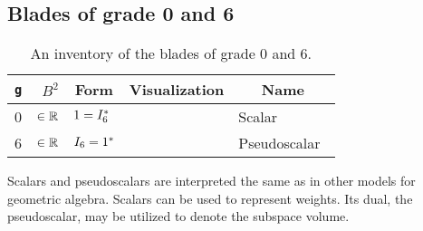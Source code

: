 
\subsection{Blades of grade 0 and 6}
\begin{table}
  \caption{An inventory of the blades of grade 0 and 6.}
  \label{tab:inv0}
  \begin{center}
    \begin{tabular}{|c|r|l|c|l|}
      \hline
      \multicolumn{1}{|c|}{\texttt{g}} & $B^2$ & \multicolumn{1}{|c|}{Form} & \multicolumn{1}{|c|}{Visualization} & \multicolumn{1}{|c|}{Name} \\ \hline
      \hline
      0 & $\in \mathbb{R}$ & $1 = I_6^\ast$ & & Scalar~\cite{TheBook} \\ \hline
      6 & $\in \mathbb{R}$ & $I_6 = 1^\ast$ & & Pseudoscalar~\cite{TheBook} \\ \hline
    \end{tabular}
  \end{center}
\end{table}

Scalars and pseudoscalars are interpreted the same as in other models for geometric algebra.  Scalars can be used to represent weights.  Its dual, the pseudoscalar, may be utilized to denote the subspace volume.

